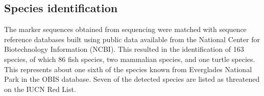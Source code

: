 \documentclass[10pt]{article}
\begin{document}
\subsection*{Species identification}

The marker sequences obtained from sequencing were matched with sequence reference databases built using public data available from the National Center for Biotechnology Information (NCBI). This resulted in the identification of 163 species, of which 86 fish species, two mammalian species, and one turtle species. This represents about one sixth of the species known from Everglades National Park in the OBIS database. Seven of the detected species are listed as threatened on the IUCN Red List.




\end{document}
